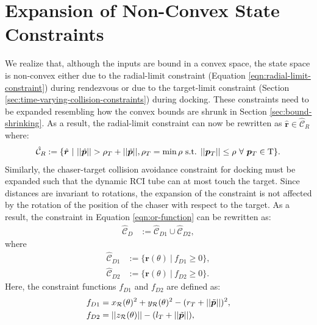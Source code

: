\section{Expansion of Non-Convex State Constraints}
\label{sec:non-convex_const_expansion}
We realize that, although the inputs are bound in a convex space, the state space is non-convex either due to the radial-limit constraint (Equation \ref{eqn:radial-limit-constraint}) during rendezvous or due to the target-limit constraint (Section \ref{sec:time-varying-collision-constraints}) during docking.
These constraints need to be expanded resembling how the convex bounds are shrunk in Section \ref{sec:bound-shrinking}.
As a result, the radial-limit constraint can now be rewritten as $\hat{\boldsymbol{r}}\in\hat{{\mathcal{C}}}_R$ where:
\begin{alignat}{2}
    \hat{{\mathcal{C}}}_R:=\{\hat{\boldsymbol{r}}\ |\ ||\hat{\boldsymbol{p}}||>\rho_T+||\Tilde{\boldsymbol{p}}||, \rho_T=\min\rho \text{ s.t. } ||\boldsymbol{p}_T||\leq\rho\ \forall\ \boldsymbol{p}_T\in\text{T}\}.
\end{alignat}
Similarly, the chaser-target collision avoidance constraint for docking must be expanded such that the dynamic RCI tube can at most touch the target.
Since distances are invariant to rotations, the expansion of the constraint is not affected by the rotation of the position of the chaser with respect to the target.
As a result, the constraint in Equation \ref{eqn:or-function} can be rewritten as:
\begin{align}
    \hat{{\mathcal{C}}}_D&:=\hat{{\mathcal{C}}}_{D1}\cup\hat{{\mathcal{C}}}_{D2},\label{eqn:expanded-target-limit-constraint}
\end{align}
where
\begin{subequations}
\begin{align}
    \hat{{\mathcal{C}}}_{D1}&:=\{\boldsymbol{r}(\theta)\ |\ f_{D1}\geq0\},\\
    \hat{{\mathcal{C}}}_{D2}&:=\{\boldsymbol{r}(\theta)\ |\ f_{D2}\geq0\}.
\end{align}
\end{subequations}
Here, the constraint functions $f_{D1}$ and $f_{D2}$ are defined as:
\begin{subequations}
\begin{align}
    f_{D1}&=x_{\mathcal{R}}(\theta)^2 + y_{\mathcal{R}}(\theta)^2 - (r_T+||\Tilde{\boldsymbol{p}}||)^2,\\
    f_{D2}&=||z_{\mathcal{R}}(\theta)|| - (l_T+||\Tilde{\boldsymbol{p}}||),
\end{align}
\end{subequations}
